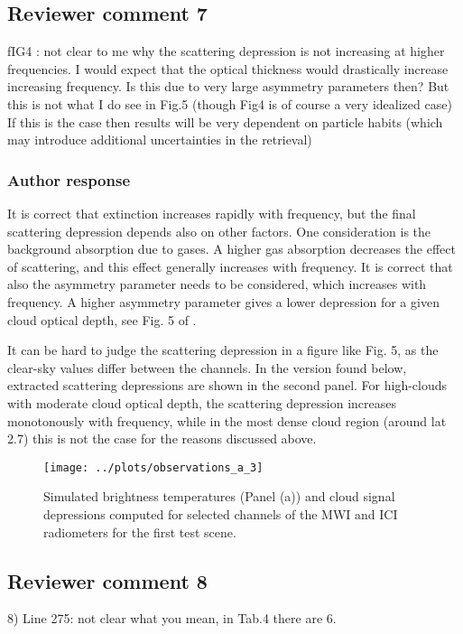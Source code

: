 \documentclass[11pt]{scrartcl}
\begin{document}
\subsection*{Reviewer comment 7}

fIG4 : not clear to me why the scattering depression is not increasing at
higher frequencies. I would expect that the optical thickness would drastically
increase increasing frequency. Is this due to very large asymmetry parameters
then? But this is not what I do see in Fig.5 (though Fig4 is of course a very
idealized case) If this is the case then results will be very dependent on
particle habits (which may introduce additional uncertainties in the retrieval)

\subsubsection*{Author response}

It is correct that extinction increases rapidly with frequency, but the final
scattering depression depends also on other factors. One consideration is the
background absorption due to gases. A higher gas absorption decreases the effect
of scattering, and this effect generally increases with frequency. It is correct
that also the asymmetry parameter needs to be considered, which increases with
frequency. A higher asymmetry parameter gives a lower depression for a given
cloud optical depth, see Fig. 5 of \citet{eriksson15}.

It can be hard to judge the scattering depression in a figure like Fig. 5, as
the clear-sky values differ between the channels. In the version found below,
extracted scattering depressions are shown in the second panel. For high-clouds
with moderate cloud optical depth, the scattering depression increases
monotonously with frequency, while in the most dense cloud region (around lat
2.7) this is not the case for the reasons discussed above.

\begin{figure}[!hbpt]
  \centering
  \texttt{[image: ../plots/observations\_a\_3]}
  \caption{Simulated brightness temperatures (Panel (a)) and cloud signal
    depressions computed for selected channels of the MWI and ICI radiometers
    for the first test scene.}
  \label{fig:depressions}
\end{figure}

\subsection*{Reviewer comment 8}
8) Line 275: not clear what you mean, in Tab.4 there are 6. 
\end{document}

